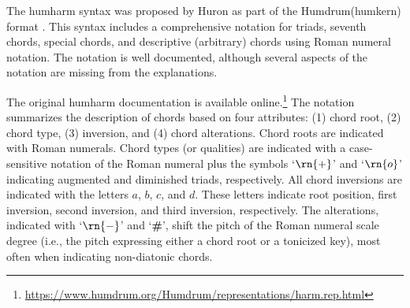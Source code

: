 

The \gls{humharm} syntax was proposed by Huron as part of
the Humdrum(\gls{humkern}) format
\parencite{huron1994humdrum}. This syntax includes a
comprehensive notation for triads, seventh chords, special
chords, and descriptive (arbitrary) chords using Roman
numeral notation. The notation is well documented, although
several aspects of the notation are missing from the
explanations.

The original \gls{humharm} documentation is available
online.\footnote{\href{https://www.humdrum.org/Humdrum/representations/harm.rep.html}{https://www.humdrum.org/Humdrum/representations/harm.rep.html}}
The notation summarizes the description of chords based on
four attributes: (1) chord root, (2) chord type, (3)
inversion, and (4) chord alterations. Chord roots are
indicated with Roman numerals. Chord types (or qualities)
are indicated with a case-sensitive notation of the Roman
numeral plus the symbols `$\rn{+}$' and `$\rn{o}$'
indicating augmented and diminished triads, respectively.
All chord inversions are indicated with the letters $a$,
$b$, $c$, and $d$. These letters indicate root position,
first inversion, second inversion, and third inversion,
respectively. The alterations, indicated with `$\rn{-}$' and
`\textbf{\#}', shift the pitch of the Roman numeral scale
degree (i.e., the pitch expressing either a chord root or a
tonicized key), most often when indicating non-diatonic
chords.
